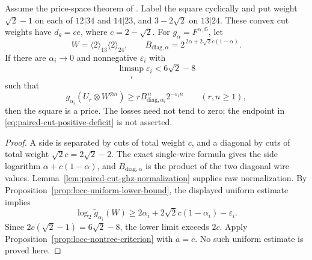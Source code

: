\begin{corollary}
\label{cor:paired-cut-positive-deficit}
Assume the price-space theorem of
\cite[Proposition~C.3]{Anthropic2026}.
Label the square cyclically and put weight \(\sqrt2-1\) on each of
\(12|34\) and \(14|23\), and \(3-2\sqrt2\) on \(13|24\).
These convex cut weights have \(d_\theta=c e\), where
\(c=2-\sqrt2\).
For \(g_\alpha=F^{\alpha,\mathbb G}\), let
\[
 W=\langle2\rangle_{13}\langle2\rangle_{24},\qquad
 B_{\mathrm{diag},\alpha}
   =2^{\,2\alpha+2\sqrt2c(1-\alpha)}.
\]
If there are \(\alpha_i\to0\) and nonnegative \(\varepsilon_i\) with
\begin{equation}\label{eq:paired-cut-positive-deficit}
 \limsup_i\varepsilon_i<6\sqrt2-8
\end{equation}
such that
\[
 g_{\alpha_i}(U_r\otimes W^{\otimes n})
 \geq r B_{\mathrm{diag},\alpha_i}^{\,n}2^{-\varepsilon_i n}
 \qquad(r,n\geq1),
\]
then the square is a price.
The losses need not tend to zero; the endpoint in
\eqref{eq:paired-cut-positive-deficit} is not asserted.
\end{corollary}
\begin{proof}
A side is separated by cuts of total weight \(c\), and a diagonal
by cuts of total weight \(\sqrt2c=2\sqrt2-2\).
The exact single-wire formula gives the side logarithm
\(\alpha+c(1-\alpha)\), and \(B_{\mathrm{diag},\alpha}\)
is the product of the two diagonal wire values.
Lemma~\ref{lem:paired-cut-ghz-normalization} supplies raw normalization.
By Proposition~\ref{prop:locc-uniform-lower-bound}, the displayed
uniform estimate implies
\[
 \log_2\widetilde g_{\alpha_i}(W)
 \geq2\alpha_i+2\sqrt2c(1-\alpha_i)-\varepsilon_i.
\]
Since \(2c(\sqrt2-1)=6\sqrt2-8\), the lower limit exceeds \(2c\).
Apply Proposition~\ref{prop:locc-nontree-criterion} with \(a=c\).
No such uniform estimate is proved here.
\end{proof}

